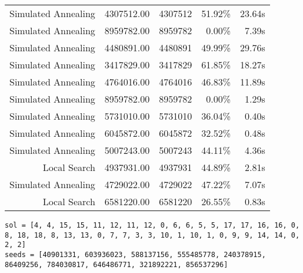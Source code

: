\begin{table}[ht]
\begin{tabular}{|r|r|r|r|r|}
Simulated Annealing & 4307512.00 & 4307512 & 51.92\% & 23.64s\\
Simulated Annealing & 8959782.00 & 8959782 & 0.00\% & 7.39s\\
Simulated Annealing & 4480891.00 & 4480891 & 49.99\% & 29.76s\\
Simulated Annealing & 3417829.00 & 3417829 & 61.85\% & 18.27s\\
Simulated Annealing & 4764016.00 & 4764016 & 46.83\% & 11.89s\\
Simulated Annealing & 8959782.00 & 8959782 & 0.00\% & 1.29s\\
Simulated Annealing & 5731010.00 & 5731010 & 36.04\% & 0.40s\\
Simulated Annealing & 6045872.00 & 6045872 & 32.52\% & 0.48s\\
Simulated Annealing & 5007243.00 & 5007243 & 44.11\% & 4.36s\\
Local Search & 4937931.00 & 4937931 & 44.89\% & 2.81s\\
Simulated Annealing & 4729022.00 & 4729022 & 47.22\% & 7.07s\\
Local Search & 6581220.00 & 6581220 & 26.55\% & 0.83s\\
\end{tabular}%
\end{table}
\begin{lstlisting}[label={lst:call18vehicle5},caption=Optimal solution call\_18\_vehicle\_5]
sol = [4, 4, 15, 15, 11, 12, 11, 12, 0, 6, 6, 5, 5, 17, 17, 16, 16, 0, 8, 18, 18, 8, 13, 13, 0, 7, 7, 3, 3, 10, 1, 10, 1, 0, 9, 9, 14, 14, 0, 2, 2]
seeds = [40901331, 603936023, 588137156, 555485778, 240378915, 86409256, 784030817, 646486771, 321892221, 856537296]
\end{lstlisting}%
\clearpage


